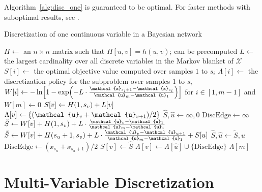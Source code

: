 \documentclass[twoside,11pt]{article}
\newcommand{\citet}[1]{\citeauthor{#1} \citeyear{#1}}
\newcommand{\paren}[1]{\mathopen{}\mathclose\bgroup\left(#1\aftergroup\egroup\right)}
\newcommand{\brock}[1]{\mathopen{}\mathclose\bgroup\left[#1\aftergroup\egroup\right]}
\newcommand{\curly}[1]{\mathopen{}\mathclose\bgroup\left\{#1\aftergroup\egroup\right\}}
\newcommand{\cX}{\mathcal{X}} %
\newcommand{\cx}{\mathcal{x}} %
\newcommand{\cu}{\mathcal{u}} %
\begin{document}
Algorithm~\ref{alg:disc_one} is guaranteed to be optimal.
For faster methods with suboptimal results, see \citet{Boulle_2006}.

\begin{algorithm}
  \caption{Discretization of one continuous variable in a Bayesian network}
  \label{alg:disc_one}
  \begin{algorithmic}[5]
    \Function{DiscretizeOne}{$D$, $G$, $\cX$}
      \State $H \leftarrow$ an $n \times n$ matrix such that $H[u,v] = h(u,v)$; can be precomputed
      \State $L \leftarrow$ the largest cardinality over all discrete variables in the Markov blanket of $\cX$
      \State $S[i] \leftarrow$ the optimal objective value computed over samples $1$ to $s_i$
      \State $\Lambda[i] \leftarrow$ the discretization policy for the subproblem over samples $1$ to $s_i$
      \State $W[i]  \leftarrow - \ln\brock{1 - {\exp\paren{- L \cdot{ {{\cx_{s_i+1} - \cx_{s_i}}\over{\cu_m - \cu_1}}}}}}$ for $i \in [1,m-1]$ and $W[m] \leftarrow 0$
          \State $S[v] \leftarrow H \paren{1,s_v} + L[v]$
          \State $\Lambda[v] \leftarrow \curly{({\cu_v + \cu_{v+1}}) / 2}$
        \Else
          \State $\hat{S}, \hat{u} \leftarrow \infty, 0$
          \State $\text{DiscEdge} \leftarrow \infty$
              \State $\tilde{S} \leftarrow W[v] + H \paren{1, s_v} +  {L \cdot {\frac{\cu_{v} - \cu_1}{\cu_m - \cu_1}}}$
            \Else
              \State $\tilde{S} \leftarrow W[v] + H \paren{s_u+1, s_v} +  {L \cdot {\frac{\cu_{v} - \cu_{u + 1}}{\cu_m - \cu_1}}} + S[u]$
            \EndIf
              \State $\hat{S}, \hat{u} \leftarrow \tilde{S}, u$
              \State $\text{DiscEdge} \leftarrow ({\cx_{s_u} + \cx_{s_u+1}}) / 2$
            \EndIf
          \EndFor
          \State $S[v] \leftarrow \hat{S}$
          \State $\Lambda[v] \leftarrow \Lambda[\hat{u}] \cup \{ \text{DiscEdge} \}$
        \EndIf
      \EndFor
      \State \Return $\Lambda[m]$
    \EndFunction
  \end{algorithmic}
\end{algorithm}


\section{Multi-Variable Discretization}
\label{sec:multi_var}
\end{document}
